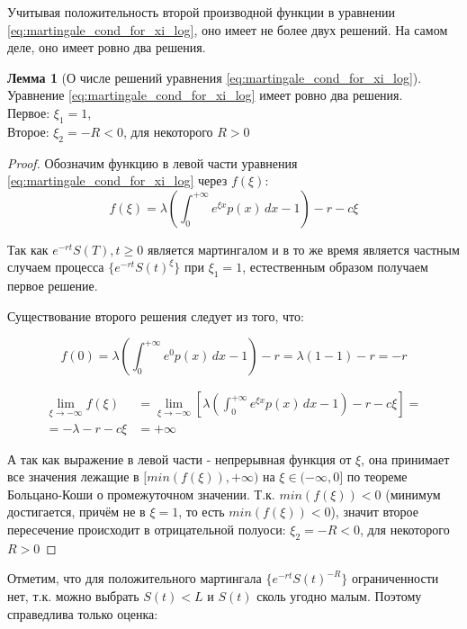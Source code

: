 \documentclass[a4paper,12pt]{article}
\theoremstyle{definition}
\newtheorem{lemma}{Лемма}
\begin{document}
Учитывая положительность второй производной функции в уравнении \eqref{eq:martingale_cond_for_xi_log}, оно имеет не более двух решений. На самом деле, оно имеет ровно два решения.
\begin{lemma}[О числе решений уравнения \eqref{eq:martingale_cond_for_xi_log}]\label{thm:solution_for_mart_cond_m1}
Уравнение \eqref{eq:martingale_cond_for_xi_log} имеет ровно два решения. \\
Первое: $\xi_1 = 1$, \\
Второе: $\xi_2 = -R < 0$, для некоторого $R > 0$
\end{lemma}
\begin{proof}
Обозначим функцию в левой части уравнения \eqref{eq:martingale_cond_for_xi_log} через $f(\xi)$:
\begin{equation*}
f(\xi) = \lambda \left(\int_{0}^{+\infty} e^{\xi x} p(x) \,dx - 1\right) - r - c\xi
\end{equation*}

Так как ${e^{-rt} S(T), t \ge 0}$ является мартингалом и в то же время является частным случаем процесса  $\{e^{-rt}S(t)^{\xi}\}$ при $\xi_1 = 1$, естественным образом получаем первое решение.

Существование второго решения следует из того, что:

\begin{equation*}
f(0) = \lambda \left(\int_{0}^{+\infty} e^{0} p(x) \,dx - 1\right) - r = \lambda (1 - 1) - r = -r
\end{equation*}

\begin{equation*}
\begin{split}
\lim_{\xi\to-\infty} f(\xi) &= \lim_{\xi\to-\infty} \left[ \lambda \left(\int_{0}^{+\infty} e^{\xi x} p(x) \,dx - 1\right) - r - c\xi \right] =\\
= - \lambda - r - c \xi &= +\infty
\end{split}
\end{equation*}

А так как выражение в левой части - непрерывная функция от $\xi$, она принимает все значения лежащие в $[min(f(\xi)), +\infty)$ на $\xi \in (-\infty, 0]$ по теореме Больцано-Коши о промежуточном значении. Т.к. $min(f(\xi)) < 0$ (минимум достигается, причём не в $\xi = 1$, то есть $min(f(\xi)) < 0$), значит второе пересечение происходит в отрицательной полуоси: $\xi_2 = -R < 0$, для некоторого $R > 0$
\end{proof}

Отметим, что для положительного мартингала $\{e^{-rt} S(t)^{-R}\}$ ограниченности нет, т.к. можно выбрать $S(t) < L$ и $S(t)$ сколь угодно малым. Поэтому справедлива только оценка:
\end{document}
